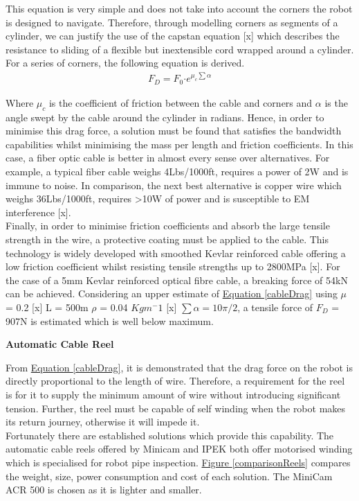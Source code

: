 \documentclass[11pt]{article}		%
\newcommand{\figref}[1]{\hyperref[#1]{Figure \ref*{#1}}}    %
\newcommand{\equationref}[1]{\hyperref[#1]{Equation \ref*{#1}}}     %
\begin{document}
	        This equation is very simple and does not take into account the corners the robot is designed to navigate. 
	        Therefore, through modelling corners as segments of a cylinder, we can justify the use of the capstan equation [x] which describes the resistance to sliding of a flexible but inextensible cord wrapped around a cylinder. 
	        For a series of corners, the following equation is derived.
	        \begin{align}
	                F_D = F_0 \boldsymbol{\cdot} {e}^{\mu_c \sum \alpha} \label{cableDrag}
	        \end{align}
	
			Where $\mu_c$ is the coefficient of friction between the cable and corners and $\alpha$ is the angle swept by the cable around the cylinder in radians. 
		    Hence, in order to minimise this drag force, a solution must be found that satisfies the bandwidth capabilities whilst minimising the mass per length and friction coefficients.  
		    In this case, a fiber optic cable is better in almost every sense over alternatives. 
		    For example, a typical fiber cable weighs 4Lbs/1000ft, requires a power of 2W and is immune to noise. 
		    In comparison, the next best alternative is copper wire which weighs 36Lbs/1000ft, requires >10W of power and is susceptible to EM interference [x].
		    \\
		    Finally, in order to minimise friction coefficients and absorb the large tensile strength in the wire, a protective coating must be applied to the cable. 
		    This technology is widely developed with smoothed Kevlar reinforced cable offering a low friction coefficient whilst resisting tensile strengths up to 2800MPa [x]. For the case of a 5mm Kevlar reinforced optical fibre cable, a breaking force of 54kN can be achieved. 
		    Considering an upper estimate of \equationref{cableDrag} using $\mu$ = 0.2 [x] L = 500m $\rho$ = 0.04 $Kgm^-1$ [x] $\sum \alpha = 10\pi/2$, a tensile force of $F_D$ = 907N is estimated which is well below maximum. 
		    
		    \textbf{Automatic Cable Reel}
	
	        From \equationref{cableDrag}, it is demonstrated that the drag force on the robot is directly proportional to the length of wire. 
	        Therefore, a requirement for the reel is for it to supply the minimum amount of wire without introducing significant tension. 
	        Further, the reel must be capable of self winding when the robot makes its return journey, otherwise it will impede it.
	        \\ 
	        \hspace*{3ex}Fortunately there are established solutions which provide this capability. 
	        The automatic cable reels offered by Minicam and IPEK both offer motorised winding which is specialised for robot pipe inspection. 
	        \figref{comparisonReels} compares the weight, size, power consumption and cost of each solution. 
	        The MiniCam ACR 500 is chosen as it is lighter and smaller. 
	
\end{document}
